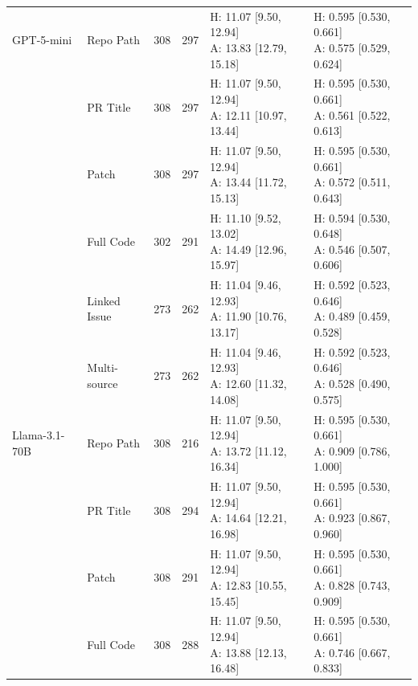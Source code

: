 \begin{table}[tbp]
\begin{tabular}{llrrll}
GPT-5-mini & Repo Path & 308 & 297 & \shortstack[l]{H: 11.07 [9.50, 12.94]\\A: 13.83 [12.79, 15.18]} & \shortstack[l]{H: 0.595 [0.530, 0.661]\\A: 0.575 [0.529, 0.624]} \\
 & PR Title & 308 & 297 & \shortstack[l]{H: 11.07 [9.50, 12.94]\\A: 12.11 [10.97, 13.44]} & \shortstack[l]{H: 0.595 [0.530, 0.661]\\A: 0.561 [0.522, 0.613]} \\
 & Patch & 308 & 297 & \shortstack[l]{H: 11.07 [9.50, 12.94]\\A: 13.44 [11.72, 15.13]} & \shortstack[l]{H: 0.595 [0.530, 0.661]\\A: 0.572 [0.511, 0.643]} \\
 & Full Code & 302 & 291 & \shortstack[l]{H: 11.10 [9.52, 13.02]\\A: 14.49 [12.96, 15.97]} & \shortstack[l]{H: 0.594 [0.530, 0.648]\\A: 0.546 [0.507, 0.606]} \\
 & Linked Issue & 273 & 262 & \shortstack[l]{H: 11.04 [9.46, 12.93]\\A: 11.90 [10.76, 13.17]} & \shortstack[l]{H: 0.592 [0.523, 0.646]\\A: 0.489 [0.459, 0.528]} \\
 & Multi-source & 273 & 262 & \shortstack[l]{H: 11.04 [9.46, 12.93]\\A: 12.60 [11.32, 14.08]} & \shortstack[l]{H: 0.592 [0.523, 0.646]\\A: 0.528 [0.490, 0.575]} \\
\midrule
Llama-3.1-70B & Repo Path & 308 & 216 & \shortstack[l]{H: 11.07 [9.50, 12.94]\\A: 13.72 [11.12, 16.34]} & \shortstack[l]{H: 0.595 [0.530, 0.661]\\A: 0.909 [0.786, 1.000]} \\
 & PR Title & 308 & 294 & \shortstack[l]{H: 11.07 [9.50, 12.94]\\A: 14.64 [12.21, 16.98]} & \shortstack[l]{H: 0.595 [0.530, 0.661]\\A: 0.923 [0.867, 0.960]} \\
 & Patch & 308 & 291 & \shortstack[l]{H: 11.07 [9.50, 12.94]\\A: 12.83 [10.55, 15.45]} & \shortstack[l]{H: 0.595 [0.530, 0.661]\\A: 0.828 [0.743, 0.909]} \\
 & Full Code & 308 & 288 & \shortstack[l]{H: 11.07 [9.50, 12.94]\\A: 13.88 [12.13, 16.48]} & \shortstack[l]{H: 0.595 [0.530, 0.661]\\A: 0.746 [0.667, 0.833]} \\

\end{tabular}
\end{table}
